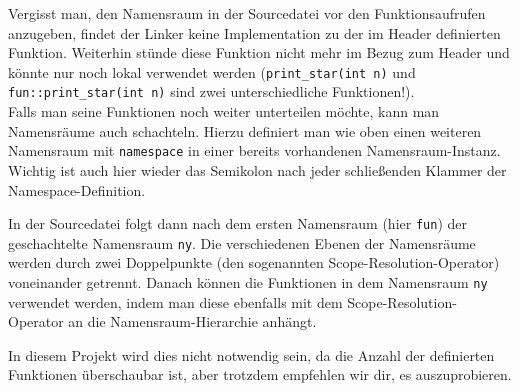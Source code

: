   

Vergisst man, den Namensraum in der Sourcedatei vor den Funktionsaufrufen anzugeben, findet der Linker keine Implementation zu der im Header definierten Funktion.
Weiterhin stünde diese Funktion nicht mehr im Bezug zum Header und könnte nur noch lokal verwendet werden (\lstinline{print_star(int n)} und \lstinline{fun::print_star(int n)} sind zwei unterschiedliche Funktionen!). \\

Falls man seine Funktionen noch weiter unterteilen möchte, kann man Namensräume auch schachteln.
Hierzu definiert man wie oben einen weiteren Namensraum mit \lstinline{namespace} in einer bereits vorhandenen Namensraum-Instanz. Wichtig ist auch hier wieder das Semikolon nach jeder schließenden Klammer der Namespace-Definition.

  

In der Sourcedatei folgt dann nach dem ersten Namensraum (hier \lstinline{fun}) der geschachtelte Namensraum \lstinline{ny}. Die verschiedenen Ebenen der Namensräume werden durch zwei Doppelpunkte (den sogenannten Scope-Resolution-Operator) voneinander getrennt.
Danach können die Funktionen in dem Namensraum \lstinline{ny} verwendet werden, indem man diese ebenfalls mit dem Scope-Resolution-Operator an die Namensraum-Hierarchie anhängt.



In diesem Projekt wird dies nicht notwendig sein, da die Anzahl der definierten Funktionen überschaubar ist, aber trotzdem empfehlen wir dir, es auszuprobieren.

